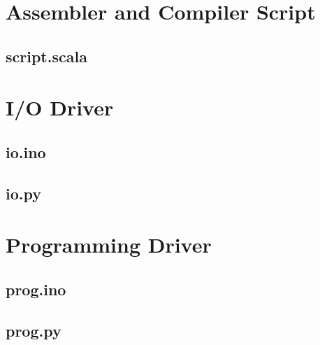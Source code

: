 \section{Assembler and Compiler Script}
\subsection{script.scala}


\section{I/O Driver}
\subsection{io.ino}

\subsection{io.py}


\section{Programming Driver}
\subsection{prog.ino}

\subsection{prog.py}

